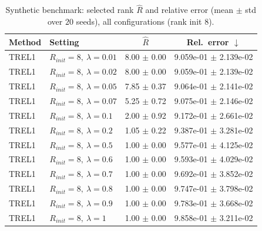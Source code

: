 \begin{table}[t]
\centering
\caption{Synthetic benchmark: selected rank \(\hat R\) and relative error (mean \(\pm\) std over \(20\) seeds), all configurations (rank init 8).}
\label{tab:results_synth_all}
\begin{tabular}{@{}llcc@{}}
\toprule
Method & Setting & \(\hat R\) & Rel.\ error \(\downarrow\) \\ \midrule
TREL1 & \(R_{init}=8,\ \lambda=0.01\) & 8.00 $\pm$ 0.00 & 9.059e-01 $\pm$ 2.139e-02 \\
TREL1 & \(R_{init}=8,\ \lambda=0.02\) & 8.00 $\pm$ 0.00 & 9.059e-01 $\pm$ 2.139e-02 \\
TREL1 & \(R_{init}=8,\ \lambda=0.05\) & 7.85 $\pm$ 0.37 & 9.064e-01 $\pm$ 2.141e-02 \\
TREL1 & \(R_{init}=8,\ \lambda=0.07\) & 5.25 $\pm$ 0.72 & 9.075e-01 $\pm$ 2.146e-02 \\
TREL1 & \(R_{init}=8,\ \lambda=0.1\) & 2.00 $\pm$ 0.92 & 9.172e-01 $\pm$ 2.661e-02 \\
TREL1 & \(R_{init}=8,\ \lambda=0.2\) & 1.05 $\pm$ 0.22 & 9.387e-01 $\pm$ 3.281e-02 \\
TREL1 & \(R_{init}=8,\ \lambda=0.5\) & 1.00 $\pm$ 0.00 & 9.577e-01 $\pm$ 4.125e-02 \\
TREL1 & \(R_{init}=8,\ \lambda=0.6\) & 1.00 $\pm$ 0.00 & 9.593e-01 $\pm$ 4.029e-02 \\
TREL1 & \(R_{init}=8,\ \lambda=0.7\) & 1.00 $\pm$ 0.00 & 9.692e-01 $\pm$ 3.852e-02 \\
TREL1 & \(R_{init}=8,\ \lambda=0.8\) & 1.00 $\pm$ 0.00 & 9.747e-01 $\pm$ 3.798e-02 \\
TREL1 & \(R_{init}=8,\ \lambda=0.9\) & 1.00 $\pm$ 0.00 & 9.783e-01 $\pm$ 3.668e-02 \\
TREL1 & \(R_{init}=8,\ \lambda=1\) & 1.00 $\pm$ 0.00 & 9.858e-01 $\pm$ 3.211e-02 \\
\bottomrule
\end{tabular}
\end{table}